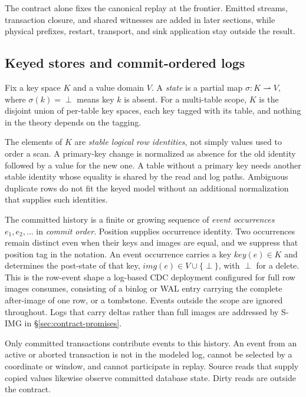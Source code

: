 \documentclass[sigconf,nonacm,10pt]{acmart}
\theoremstyle{plain}
\theoremstyle{definition}
\newcommand{\keyof}{\mathit{key}}                %
\newcommand{\imgof}{\mathit{img}}                %
\newcommand{\keys}{K}                            %
\newcommand{\vals}{V}                            %
\begin{document}
The contract alone fixes the canonical replay at the frontier. Emitted
streams, transaction closure, and shared witnesses are added in later
sections, while physical prefixes, restart, transport, and sink application
stay outside the result.

\subsection{Keyed stores and commit-ordered logs}\label{sec:setting-store}

Fix a key space $\keys$ and a value domain $\vals$. A \emph{state}
is a partial map $\sigma : \keys \rightharpoonup \vals$, where
$\sigma(k) = \perp$ means key $k$ is absent. For a multi-table
scope, $\keys$ is the disjoint union of per-table key spaces, each
key tagged with its table, and nothing in the theory depends on the
tagging.

The elements of $\keys$ are \emph{stable logical row identities}, not
simply values used to order a scan. A primary-key change is normalized
as absence for the old identity followed by a value for the new one.
A table without a primary key needs another stable identity whose
equality is shared by the read and log paths. Ambiguous duplicate rows
do not fit the keyed model without an additional normalization that
supplies such identities.

The committed history is a finite or growing sequence of
\emph{event occurrences} $e_1, e_2, \ldots$ in \emph{commit order}.
Position supplies occurrence identity. Two occurrences remain distinct
even when their keys and images are equal, and we suppress that position
tag in the notation. An event occurrence carries a key
$\keyof(e) \in \keys$ and determines the post-state of
that key, $\imgof(e) \in \vals \cup \{\perp\}$, with $\perp$ for a
delete. This is the row-event shape a log-based CDC deployment
configured for full row images consumes, consisting of a binlog or WAL entry
carrying the complete after-image
of one row, or a tombstone. Events outside the scope are ignored
throughout. Logs that carry deltas rather than full images are 
addressed by S-IMG in \S\ref{sec:contract-promises}.

Only committed transactions contribute events to this history. An
event from an active or aborted transaction is not in the modeled log,
cannot be selected by a coordinate or window, and cannot participate in
replay. Source reads that supply copied values likewise observe
committed database state. Dirty reads are outside the contract.
\end{document}
